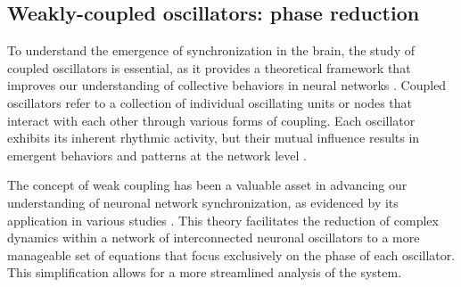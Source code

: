 \documentclass[../main.tex]{subfiles}
\begin{document}
\subsection{Weakly-coupled oscillators: phase reduction}
To understand the emergence of synchronization in the brain, the study of coupled oscillators is essential, as it provides a theoretical framework that improves our understanding of collective behaviors in neural networks \citep{ashwin_mathematical_2016}.
Coupled oscillators refer to a collection of individual oscillating units or nodes that interact with each other through various forms of coupling.
Each oscillator exhibits its inherent rhythmic activity, but their mutual influence results in emergent behaviors and patterns at the network level \citep{schwemmer2012theory,KOKSALERSOZ201746,Mallada_2013}.

The concept of weak coupling has been a valuable asset in advancing our understanding of neuronal network synchronization, as evidenced by its application in various studies \citep{kuramoto1984phase,kopell2002mechanisms,izhikevich_dynamical_2007,schwemmer2012theory}.
This theory facilitates the reduction of complex dynamics within a network of interconnected neuronal oscillators to a more manageable set of equations that focus exclusively on the phase of each oscillator. This simplification allows for a more streamlined analysis of the system.
\end{document}
